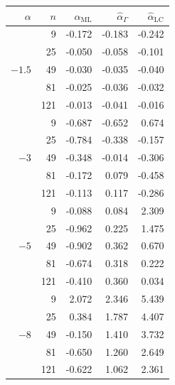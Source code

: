 \documentclass[10pt,a4paper]{article}
\begin{document}
\begin{minipage}{0.5\linewidth}
\begin{tabular}{rrrrr}
	\toprule
	$\alpha$ & $n$ & $\widehat{\alpha}_{\text{ML}}$ & $\widehat{\alpha}_{\Gamma}$ & $\widehat{\alpha}_{\text{LC}}$\\  
	\midrule
	\multirow{5 }{*}{$-1.5$}
	& 9 & -0.172 & -0.183 & -0.242 \\ 
	& 25 & -0.050 & -0.058 & -0.101 \\ 
	& 49 & -0.030 & -0.035 & -0.040 \\ 
	& 81 & -0.025 & -0.036 & -0.032 \\ 
	& 121 & -0.013 & -0.041 & -0.016 \\ 	
	\midrule
	\multirow{5 }{*}{$-3$}
	& 9 & -0.687 & -0.652 & 0.674 \\ 
	& 25 & -0.784 & -0.338 & -0.157 \\ 
	& 49 & -0.348 & -0.014 & -0.306 \\ 
	& 81 & -0.172 & 0.079 & -0.458 \\ 
	& 121 & -0.113 & 0.117 & -0.286 \\ 	
	\midrule
	\multirow{5 }{*}{$-5$} 
	& 9 & -0.088 & 0.084 & 2.309 \\ 
	& 25 & -0.962 & 0.225 & 1.475 \\ 
	& 49 & -0.902 & 0.362 & 0.670 \\ 
	& 81 & -0.674 & 0.318 & 0.222 \\ 
	& 121 & -0.410 & 0.360 & 0.034 \\ 
	\midrule
	\multirow{5 }{*}{$-8$} 	
	& 9 & 2.072 & 2.346 & 5.439 \\ 	
	& 25 & 0.384 & 1.787 & 4.407 \\ 
	& 49 & -0.150 & 1.410 & 3.732 \\ 
	& 81 & -0.650 & 1.260 & 2.649 \\ 
	& 121 & -0.622 & 1.062 & 2.361 \\ 
	\bottomrule
\end{tabular}
\end{minipage}
\;
\end{document}
